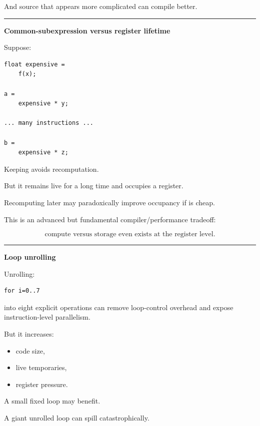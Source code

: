 And source that appears more complicated can compile better.

\begin{center}\rule{0.5\linewidth}{0.5pt}\end{center}

\textbf{Common-subexpression versus register lifetime}

Suppose:

\protect{}\label{p10-cse}%
\begin{verbatim}
float expensive =
    f(x);

a =
    expensive * y;

... many instructions ...

b =
    expensive * z;
\end{verbatim}

Keeping  avoids recomputation.

But it remains live for a long time and occupies a register.

Recomputing  later may paradoxically improve occupancy if  is cheap.

This is an advanced but fundamental compiler/performance tradeoff:

\[
\boxed{
\text{compute versus storage even exists at the register level}.
}
\]

\begin{center}\rule{0.5\linewidth}{0.5pt}\end{center}

\textbf{Loop unrolling}

Unrolling:

\protect{}\label{p10-unroll}%
\begin{verbatim}
for i=0..7
\end{verbatim}

into eight explicit operations can remove loop-control overhead and expose instruction-level parallelism.

But it increases:

\begin{itemize}
\tightlist
\item
  code size,
\item
  live temporaries,
\item
  register pressure.
\end{itemize}

A small fixed loop may benefit.

A giant unrolled loop can spill catastrophically.

